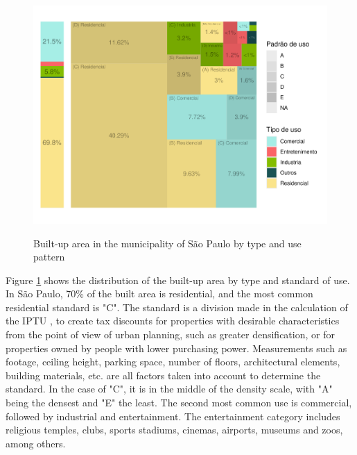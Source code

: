 \begin{apendicesenv}
    \begin{figure}
        \centering
        \caption{Built-up area in the municipality of São Paulo by type and use pattern}
        \includegraphics[width = .8\linewidth]{figuras/tree_area_construida.pdf}
        \label{fig:area_construida}
    \end{figure}
    
    Figure \ref{fig:area_construida} shows the distribution of the built-up area by type and standard of use. In São Paulo, 70\% of the built area is residential, and the most common residential standard is "C". The standard is a division made in the calculation of the IPTU \cite{lei10235_1986}, to create tax discounts for properties with desirable characteristics from the point of view of urban planning, such as greater densification, or for properties owned by people with lower purchasing power. Measurements such as footage, ceiling height, parking space, number of floors, architectural elements, building materials, etc. are all factors taken into account to determine the standard. In the case of "C", it is in the middle of the density scale, with "A" being the densest and "E" the least. The second most common use is commercial, followed by industrial and entertainment. The entertainment category includes religious temples, clubs, sports stadiums, cinemas, airports, museums and zoos, among others.
    
    
    
    
    

\end{apendicesenv}
